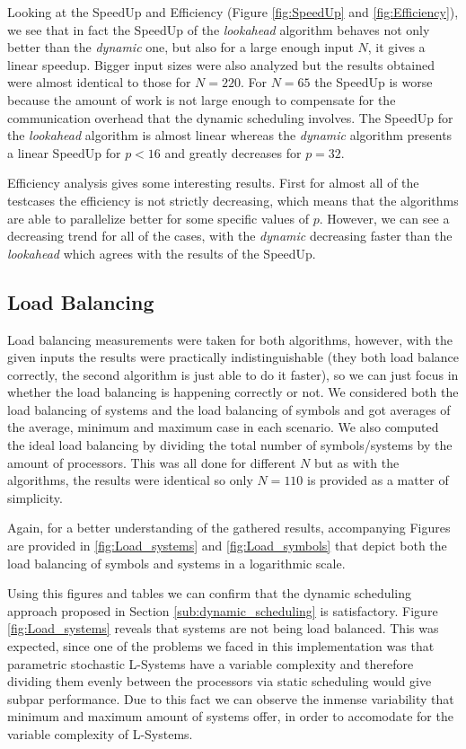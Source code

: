 \documentclass[letterpaper,twoside,11pt]{article}
\begin{document}
\begin{multicols}{2}
Looking at the SpeedUp and Efficiency (Figure \ref{fig:SpeedUp} and \ref{fig:Efficiency}), we see that in fact the SpeedUp of the \emph{lookahead} algorithm behaves not only better than the \emph{dynamic} one, but also for a large enough input $N$, it gives a linear speedup. Bigger input sizes were also analyzed but the results obtained were almost identical to those for $N = 220$. For $N=65$ the SpeedUp is worse because the amount of work is not large enough to compensate for the communication overhead that the dynamic scheduling involves. The SpeedUp for the \emph{lookahead} algorithm is almost linear whereas the \emph{dynamic} algorithm presents a linear SpeedUp for $p < 16$ and greatly decreases for $p = 32$.

Efficiency analysis gives some interesting results. First for almost all of the testcases the efficiency is not strictly decreasing, which means that the algorithms are able to parallelize better for some specific values of $p$. However, we can see a decreasing trend for all of the cases, with the \emph{dynamic} decreasing faster than the \emph{lookahead} which agrees with the results of the SpeedUp.


\subsection{Load Balancing} %
\label{sub:load_balancing}

Load balancing measurements were taken for both algorithms, however, with the given inputs the results were practically indistinguishable (they both load balance correctly, the second algorithm is just able to do it faster), so we can just focus in whether the load balancing is happening correctly or not. We considered both the load balancing of systems and the load balancing of symbols and got averages of the average, minimum and maximum case in each scenario. We also computed the ideal load balancing by dividing the total number of symbols/systems by the amount of processors. This was all done for different $N$ but as with the algorithms, the results were identical so only $N = 110$ is provided as a matter of simplicity.

Again, for a better understanding of the gathered results, accompanying Figures are provided in \ref{fig:Load_systems} and \ref{fig:Load_symbols} that depict both the load balancing of symbols and systems in a logarithmic scale.

Using this figures and tables we can confirm that the dynamic scheduling approach proposed in Section \ref{sub:dynamic_scheduling} is satisfactory. Figure \ref{fig:Load_systems} reveals that systems are not being load balanced. This was expected, since one of the problems we faced in this implementation was that parametric stochastic L-Systems have a variable complexity and therefore dividing them evenly between the processors via static scheduling would give subpar performance. Due to this fact we can observe the inmense variability that minimum and maximum amount of systems offer, in order to accomodate for the variable complexity of L-Systems.


\end{multicols}
\end{document}
